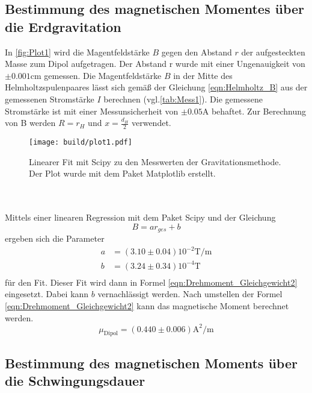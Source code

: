\subsection{Bestimmung des magnetischen Momentes über die Erdgravitation}
\label{subsec:AuswertungZu1}
In \autoref{fig:Plot1} wird die Magentfeldstärke $B$ gegen den Abstand $r$ der aufgesteckten Masse zum Dipol aufgetragen. Der Abstand r wurde mit einer Ungenauigkeit von $\pm 0.001\unit{\centi\metre}$ gemessen.
Die Magentfeldstärke $B$ in der Mitte des Helmholtzspulenpaares lässt sich gemäß der Gleichung \eqref{eqn:Helmholtz_B} aus der gemessenen Stromstärke $I$  berechnen (vgl.\autoref{tab:Mess1}). 
Die gemessene Stromstärke ist mit einer Messunsicherheit von $\pm 0.05\unit{\ampere}$ behaftet. Zur Berechnung von B werden $R = r_H$ und $x = \frac{d_H}{2}$ verwendet.
\begin{figure}
    \centering
    \texttt{[image: build/plot1.pdf]}
    \caption{Linearer Fit mit Scipy \cite{scipy} zu den Messwerten der Gravitationsmethode. Der Plot wurde mit dem Paket Matplotlib \cite{matplotlib} erstellt.}
    \label{fig:Plot1}
\end{figure} 
\\
\\
Mittels einer linearen Regression mit dem Paket Scipy \cite{scipy} und der Gleichung
\begin{equation*}
    B = ar_{ges} + b
\end{equation*}
ergeben sich die Parameter 
\begin{align*}
    a &= (3.10 \pm 0.04) 10^{-2}\unit{\tesla\per\metre}\\
    b &= (3.24 \pm 0.34) 10^{-4} \unit{\tesla}\\
\end{align*}
für den Fit. Dieser Fit wird dann in Formel \eqref{eqn:Drehmoment_Gleichgewicht2} eingesetzt. Dabei kann $b$ vernachlässigt werden. Nach umstellen der Formel 
\eqref{eqn:Drehmoment_Gleichgewicht2} kann das magnetische Moment berechnet werden.
\begin{equation}
    \label{eqn:mu1}
    \mu_{\text{Dipol}} = (0.440 \pm 0.006) \unit{\square\ampere\per\metre}
\end{equation}

\subsection{Bestimmung des magnetischen Moments über die Schwingungsdauer}
\label{subsec:AuswertungZu2}

